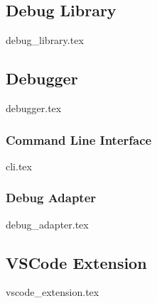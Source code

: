 \subsection{Debug Library}
\label{subsection:rust-debug}
{debug_library.tex}

\subsection{Debugger}
{debugger.tex}

\subsubsection{Command Line Interface}
{cli.tex}

\subsubsection{Debug Adapter}
{debug_adapter.tex}

\subsection{VSCode Extension}
{vscode_extension.tex}

